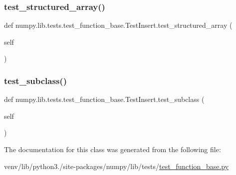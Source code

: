 \subsubsection{\texorpdfstring{test\+\_\+structured\+\_\+array()}{test\_structured\_array()}}
{\footnotesize\ttfamily def numpy.\+lib.\+tests.\+test\+\_\+function\+\_\+base.\+Test\+Insert.\+test\+\_\+structured\+\_\+array (\begin{DoxyParamCaption}\item[{}]{self }\end{DoxyParamCaption})}

\mbox{\label{classnumpy_1_1lib_1_1tests_1_1test__function__base_1_1TestInsert_a5bf3df8030480fa30cf6f6c8f0cbb2c3}} 
\subsubsection{\texorpdfstring{test\+\_\+subclass()}{test\_subclass()}}
{\footnotesize\ttfamily def numpy.\+lib.\+tests.\+test\+\_\+function\+\_\+base.\+Test\+Insert.\+test\+\_\+subclass (\begin{DoxyParamCaption}\item[{}]{self }\end{DoxyParamCaption})}



The documentation for this class was generated from the following file\+:\begin{DoxyCompactItemize}
\item 
venv/lib/python3./site-\/packages/numpy/lib/tests/\hyperlink{lib_2tests_2test__function__base_8py}{test\+\_\+function\+\_\+base.\+py}\end{DoxyCompactItemize}
